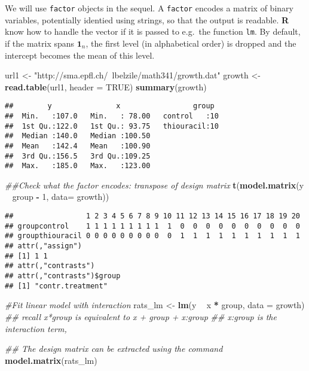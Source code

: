 \documentclass[]{book}
\newenvironment{Shaded}{\begin{snugshade}}{\end{snugshade}}
\newcommand{\CommentTok}[1]{\textcolor[rgb]{0.56,0.35,0.01}{\textit{#1}}}
\newcommand{\DataTypeTok}[1]{\textcolor[rgb]{0.13,0.29,0.53}{#1}}
\newcommand{\DecValTok}[1]{\textcolor[rgb]{0.00,0.00,0.81}{#1}}
\newcommand{\KeywordTok}[1]{\textcolor[rgb]{0.13,0.29,0.53}{\textbf{#1}}}
\newcommand{\NormalTok}[1]{#1}
\newcommand{\OperatorTok}[1]{\textcolor[rgb]{0.81,0.36,0.00}{\textbf{#1}}}
\newcommand{\OtherTok}[1]{\textcolor[rgb]{0.56,0.35,0.01}{#1}}
\newcommand{\StringTok}[1]{\textcolor[rgb]{0.31,0.60,0.02}{#1}}
\theoremstyle{definition}
\theoremstyle{definition}
\theoremstyle{definition}
\theoremstyle{remark}
\begin{document}
We will use \texttt{factor} objects in the sequel. A \texttt{factor}
encodes a matrix of binary variables, potentially identied using
strings, so that the output is readable. \textbf{R} know how to handle
the vector if it is passed to e.g.~the function \texttt{lm}. By default,
if the matrix spans \(\mathbf{1}_n\), the first level (in alphabetical
order) is dropped and the intercept becomes the mean of this level.

\begin{Shaded}
\begin{Highlighting}[]
\NormalTok{url1 <-}\StringTok{ "http://sma.epfl.ch/~lbelzile/math341/growth.dat"}
\NormalTok{growth <-}\StringTok{ }\KeywordTok{read.table}\NormalTok{(url1, }\DataTypeTok{header =} \OtherTok{TRUE}\NormalTok{)}
\KeywordTok{summary}\NormalTok{(growth)}
\end{Highlighting}
\end{Shaded}

\begin{verbatim}
##        y               x                 group   
##  Min.   :107.0   Min.   : 78.00   control   :10  
##  1st Qu.:122.0   1st Qu.: 93.75   thiouracil:10  
##  Median :140.0   Median :100.50                  
##  Mean   :142.4   Mean   :100.90                  
##  3rd Qu.:156.5   3rd Qu.:109.25                  
##  Max.   :185.0   Max.   :123.00
\end{verbatim}

\begin{Shaded}
\begin{Highlighting}[]
\CommentTok{##Check what the factor encodes: transpose of design matrix}
\KeywordTok{t}\NormalTok{(}\KeywordTok{model.matrix}\NormalTok{(y }\OperatorTok{~}\StringTok{ }\NormalTok{group }\OperatorTok{-}\StringTok{ }\DecValTok{1}\NormalTok{, }\DataTypeTok{data=}\NormalTok{ growth))}
\end{Highlighting}
\end{Shaded}

\begin{verbatim}
##                 1 2 3 4 5 6 7 8 9 10 11 12 13 14 15 16 17 18 19 20
## groupcontrol    1 1 1 1 1 1 1 1 1  1  0  0  0  0  0  0  0  0  0  0
## groupthiouracil 0 0 0 0 0 0 0 0 0  0  1  1  1  1  1  1  1  1  1  1
## attr(,"assign")
## [1] 1 1
## attr(,"contrasts")
## attr(,"contrasts")$group
## [1] "contr.treatment"
\end{verbatim}

\begin{Shaded}
\begin{Highlighting}[]
\CommentTok{#Fit linear model with interaction}
\NormalTok{rats_lm <-}\StringTok{ }\KeywordTok{lm}\NormalTok{(y }\OperatorTok{~}\StringTok{ }\NormalTok{x }\OperatorTok{*}\StringTok{ }\NormalTok{group, }\DataTypeTok{data =}\NormalTok{ growth)}
\CommentTok{## recall x*group is equivalent to x + group + x:group}
\CommentTok{## x:group is the interaction term,}

\CommentTok{## The design matrix can be extracted using the command}
\KeywordTok{model.matrix}\NormalTok{(rats_lm)}
\end{Highlighting}
\end{Shaded}
\end{document}
